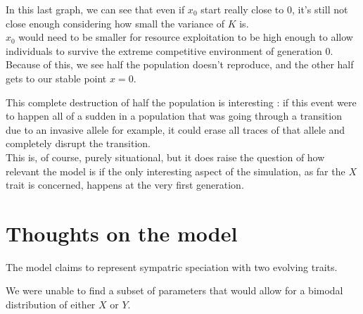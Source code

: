 \documentclass{article}
\begin{document}
In this last graph, we can see that even if $x_0$ start really close to $0$, it's still not close enough considering how small the variance of $K$ is. \\
$x_0$ would need to be smaller for resource exploitation to be high enough to allow individuals to survive the extreme competitive environment of generation 0. \\
Because of this, we see half the population doesn't reproduce, and the other half gets to our stable point $x=0$. \\
\vspace{5mm}

This complete destruction of half the population is interesting : if this event were to happen all of a sudden in a population that was going through a transition due to an invasive allele for example, it could erase all traces of that allele and completely disrupt the transition. \\
\vspace{2mm}
This is, of course, purely situational, but it does raise the question of how relevant the model is if the only interesting aspect of the simulation, as far the $X$ trait is concerned, happens at the very first generation. \\
\vspace{5mm}







\section{Thoughts on the model}

The model claims to represent sympatric speciation with two evolving traits. \\
\vspace{5mm}

We were unable to find a subset of parameters that would allow for a bimodal distribution of either $X$ or $Y$. \\
\vspace{5mm}
\end{document}
